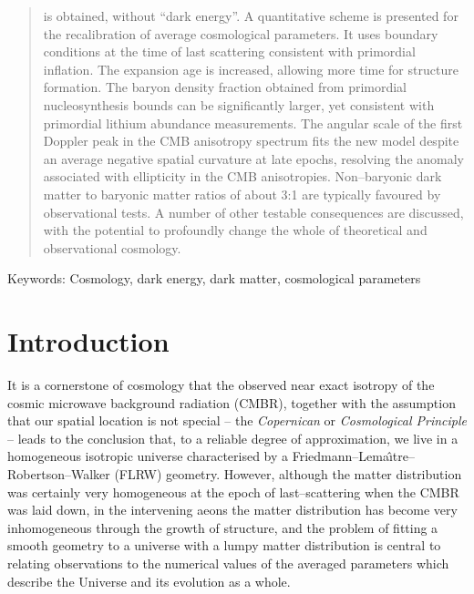 \documentclass[12pt]{iopart}
\begin{document}
\begin{abstract}
is obtained, without ``dark energy''. A quantitative scheme is presented for
the recalibration of average cosmological parameters. It uses boundary
conditions at the time of last scattering consistent with primordial
inflation. The expansion age is increased, allowing more time for structure
formation. The baryon density fraction obtained from primordial
nucleosynthesis bounds can be significantly larger, yet consistent with
primordial lithium abundance measurements. The angular scale of the first
Doppler peak in the CMB anisotropy spectrum fits the new model despite an
average negative spatial curvature at late epochs, resolving the anomaly
associated with ellipticity in the CMB anisotropies. Non--baryonic dark
matter to baryonic matter ratios of about 3:1 are typically favoured by
observational tests. A number of
other testable consequences are discussed, with the potential to profoundly
change the whole of theoretical and observational cosmology.
\end{abstract}
Keywords: Cosmology, dark energy, dark matter, cosmological parameters
\maketitle

\section{Introduction}

It is a cornerstone of cosmology that the observed near exact
isotropy of the cosmic microwave background radiation (CMBR),
together with the assumption that our spatial location is not
special -- the {\em Copernican} or {\em Cosmological Principle} --
leads to the conclusion that, to a reliable degree of approximation,
we live in a homogeneous isotropic universe characterised by a
Friedmann--Lema\^{\i}tre--Robertson--Walker (FLRW) geometry.
However, although the matter distribution was certainly very
homogeneous at the epoch of last--scattering when the CMBR was
laid down, in the intervening aeons the matter distribution has become
very inhomogeneous through the growth of structure, and the problem of
fitting a smooth geometry to a universe with a lumpy matter distribution
\cite{fit1,fit2} is central to relating observations to the numerical values
of the averaged parameters which describe the Universe and its evolution
as a whole.
\end{document}
